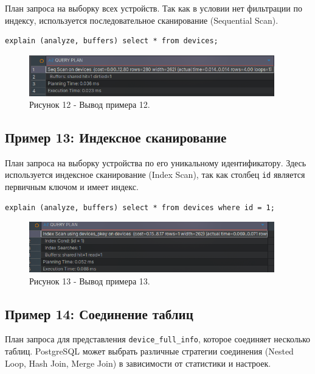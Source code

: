 \documentclass[oneside,a4paper,14pt]{extarticle}
\begin{document}
План запроса на выборку всех устройств. Так как в условии нет фильтрации по индексу, используется последовательное сканирование (Sequential Scan).

\begin{verbatim}
explain (analyze, buffers) select * from devices;
\end{verbatim}

\begin{figure}[H]
  \centering
  \includegraphics[width=0.95\textwidth]{pics/explain_1.png}
  \caption*{Рисунок 12 - Вывод примера 12.}
\end{figure}

\subsection*{Пример 13: Индексное сканирование}

План запроса на выборку устройства по его уникальному идентификатору. Здесь используется индексное сканирование (Index Scan), так как столбец \texttt{id} является первичным ключом и имеет индекс.

\begin{verbatim}
explain (analyze, buffers) select * from devices where id = 1;
\end{verbatim}

\begin{figure}[H]
  \centering
  \includegraphics[width=0.95\textwidth]{pics/explain_2.png}
  \caption*{Рисунок 13 - Вывод примера 13.}
\end{figure}

\subsection*{Пример 14: Соединение таблиц}

План запроса для представления \texttt{device\_full\_info}, которое соединяет несколько таблиц. PostgreSQL может выбрать различные стратегии соединения (Nested Loop, Hash Join, Merge Join) в зависимости от статистики и настроек.
\end{document}
